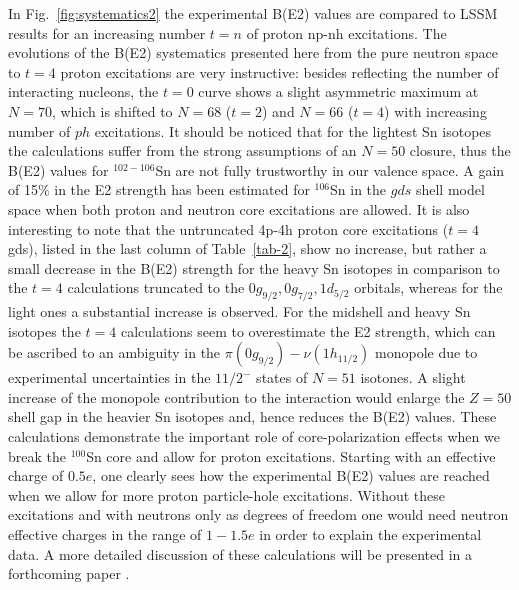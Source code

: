 \documentclass[prc,twocolumn,amssymb,amsmath,showpacs,superscriptaddress]{revtex4}
\begin{document}
In Fig.~\ref{fig:systematics2} the experimental B(E2) values
\cite{ban05, ram01, rad04} are compared to LSSM results for an
increasing number $t=n$ of proton np-nh excitations. The
evolutions of the B(E2) systematics presented here from the pure
neutron space to $t=4$ proton excitations are very instructive:
besides reflecting the number of interacting nucleons, the $t=0$
curve shows a slight asymmetric maximum at $N=70$, which is
shifted to $N=68$ ($t=2$) and $N=66$ ($t=4$) with increasing
number of $ph$ excitations. It should be noticed that for the
lightest Sn isotopes the calculations suffer from the strong
assumptions of an $N=50$ closure, thus the B(E2) values for
$^{102-106}$Sn are not fully trustworthy in our valence space. A
gain of 15$\%$ in the E2 strength has been estimated for
$^{106}$Sn in the $gds$ shell model space when both proton and
neutron core excitations are allowed. It is also interesting to
note that the untruncated 4p-4h proton core excitations ($t=4$
gds), listed in the last column of Table~\ref{tab-2}, show no
increase, but rather a small decrease in the B(E2) strength for
the heavy Sn isotopes in comparison to the $t=4$ calculations
truncated to the $0g_{9/2},0g_{7/2},1d_{5/2}$ orbitals, whereas
for the light ones a substantial increase is observed. For the
midshell and heavy Sn isotopes the $t=4$ calculations seem to
overestimate the E2 strength, which can be ascribed to an
ambiguity in the $\pi (0g_{9/2}) - \nu (1h_{11/2})$ monopole due
to experimental uncertainties in the $11/2^-$ states of $N=51$
isotones. A slight increase of the monopole contribution to the
interaction would enlarge the $Z=50$ shell gap in the heavier Sn
isotopes and, hence reduces the B(E2) values. These calculations
demonstrate the important role of core-polarization effects when
we break the $^{100}$Sn core and allow for proton excitations.
Starting with an effective charge of $0.5e$, one clearly sees how
the experimental B(E2) values are reached when we allow for more
proton particle-hole excitations. Without these excitations and
with neutrons only as degrees of freedom one would need neutron
effective charges in the range of $1-1.5e$ in order to explain the
experimental data. A more detailed discussion of these
calculations will be presented in a forthcoming paper
\cite{gni05}.\\
\end{document}
